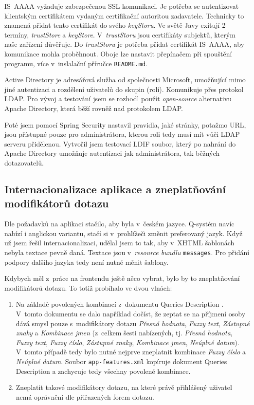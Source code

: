 \documentclass[thesis=M,czech]{FITthesis}[2019/12/23]
\begin{document}
IS~AAAA vyžaduje zabezpečenou SSL komunikaci. Je potřeba se autentizovat klientským certifikátem vydaným certifikační autoritou zadavatele. Technicky to znamená přidat tento certifikát do svého \textit{keyStoru}. Ve světě Javy exitují 2 termíny, \textit{trustStore} a \textit{keyStore}. V~\textit{trustStoru} jsou certifikáty subjektů, kterým naše zařízení důvěřuje. \cite{KeyStore}
Do \textit{trustStoru} je potřeba přidat certifikát IS~AAAA, aby komunikace mohla proběhnout. Oboje lze nastavit přepínačem při spouštění programu, více v~inslalační příručce \texttt{README.md}. 

Active Directory je adresářová služba od společnosti Microsoft, umožňující mimo jiné autentizaci a rozdělení uživatelů do skupin (rolí). Komunikuje přes protokol LDAP. Pro vývoj a testování jsem se rozhodl použít \textit{open-source} alternativu Apache Directory, která běží rovněž nad protokolem LDAP. \cite{ApacheDS}

Poté jsem pomocí Spring Security nastavil pravidla, jaké stránky, potažmo URL, jsou přístupné pouze pro administrátora, kterou roli tedy musí mít vůči LDAP serveru přidělenou. \cite{SpringSecurity}
Vytvořil jsem testovací LDIF soubor, který po nahrání do Apache Directory umožňuje autentizaci jak administrátora, tak běžných dotazovatelů.

\subsection{Internacionalizace aplikace a zneplatňování modifikátorů dotazu}
Dle požadavků na aplikaci stačilo, aby byla v~českém jazyce. Q-systém navíc nabízí i anglickou variantu, stačí si v~prohlížeči změnit preferovaný jazyk. Když už jsem řešil internacionalizaci, udělal jsem to tak, aby v~XHTML šablonách nebyla textace pevně daná. Textace jsou v~\textit{resource bundlu} \texttt{messages}. Pro přidání podpory dalšího jazyka tedy není nutné měnit šablony.

Kdybych měl z~práce na frontendu ještě něco vybrat, bylo by to zneplatňování modifikátorů dotazu.
To totiž probíhalo ve dvou vlnách:
\begin{enumerate}
	\item Na základě povolených kombinací z~dokumentu Queries Description \cite{Queries}. V~tomto dokumentu se dalo například dočíst, že zeptat se na příjmení osoby dává smysl pouze s~modifikátory dotazu \textit{Přesná hodnota}, \textit{Fuzzy text}, \textit{Zástupné znaky} a \textit{Kombinace jmen} (z~celkem šesti nabízených, tj. \textit{Přesná hodnota}, \textit{Fuzzy text}, \textit{Fuzzy číslo}, \textit{Zástupné znaky}, \textit{Kombinace jmen}, \textit{Neúplné datum}). V~tomto případě tedy bylo nutné nejprve zneplatnit kombinace \textit{Fuzzy číslo} a \textit{Neúplné datum}. Soubor \texttt{app-features.xml} kopíruje dokument Queries Description a zachycuje tedy všechny povolené kombinace. \cite{Queries}
	\item Zneplatit takové modifikátory dotazu, na které právě přihlášený uživatel nemá oprávnění dle přiřazených forem dotazu. 
\end{enumerate} 
\end{document}
